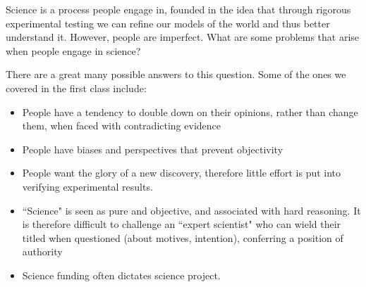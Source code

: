 \documentclass[addpoints,12pt]{exam}
\begin{document}
\begin{questions}
\clearpage
\bonusquestion[4] Science is a process people engage in, founded in the idea that through rigorous experimental testing we can refine our models of the world and thus better understand it. However, people are imperfect. What are some problems that arise when people engage in science?
\begin{TheSolution}
	There are a great many possible answers to this question. Some of the ones we covered in the first class include:
\begin{itemize}
	\item People have a tendency to double down on their opinions, rather than change them, when faced with contradicting evidence
\item People have biases and perspectives that prevent objectivity
\item People want the glory of a new discovery, therefore little effort is put into verifying experimental results.
\item ``Science" is seen as pure and objective, and associated with hard reasoning. It is therefore difficult to challenge an ``expert scientist" who can wield their titled when questioned (about motives, intention), conferring a position of authority
\item Science funding often dictates science project.
\end{itemize}
\end{TheSolution}

\end{questions}
\end{document}
